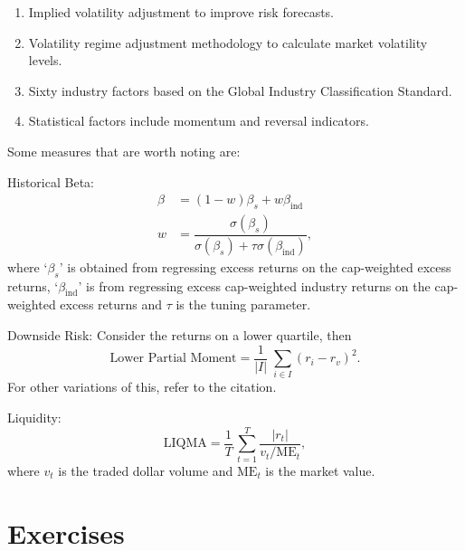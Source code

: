 \begin{enumerate}[--]
\item Implied volatility adjustment to improve risk forecasts.
\item Volatility regime adjustment methodology to calculate market volatility levels.
\item Sixty industry factors based on the Global Industry Classification Standard.
\item Statistical factors include momentum and reversal indicators. 
\end{enumerate}


Some measures that are worth noting are: \twomedskip

\noindent Historical Beta:
	\[
	\begin{split}
	\beta&= (1-w) \beta_s + w \beta_{\text{ind}} \\
	w&= \dfrac{\sigma(\beta_s)}{\sigma(\beta_s) + \tau \sigma(\beta_{\text{ind}})},
	\end{split}
	\]
where `$\beta_s$' is obtained from regressing excess returns on the cap-weighted excess returns, `$\beta_{\text{ind}}$' is from regressing excess cap-weighted industry returns on the cap-weighted excess returns and $\tau$ is the tuning parameter. \twomedskip


\noindent Downside Risk: Consider the returns on a lower quartile, then
	\[
	\text{Lower Partial Moment}= \dfrac{1}{\lvert I \rvert} \; \sum_{i \in I} (r_i - r_v)^2.
	\]
For other variations of this, refer to the citation. \twomedskip


\noindent Liquidity: 
	\[
	\text{LIQMA}= \dfrac{1}{T} \, \sum_{t=1}^T \dfrac{\lvert r_t \rvert}{v_t/\text{ME}_t},
	\]
where $v_t$ is the traded dollar volume and $\text{ME}_t$ is the market value. 



\section{Exercises}

